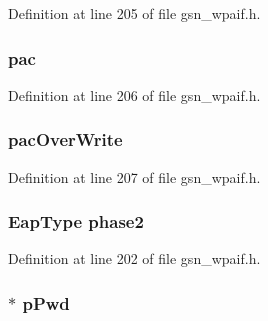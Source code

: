 Definition at line 205 of file gsn\_\-wpaif.h.

\hypertarget{a00423_a33c4dc19eab43caa7d0e1c94cb079af8}{
\subsubsection[{pac}]{ {\bf pac}}}
\label{a00423_a33c4dc19eab43caa7d0e1c94cb079af8}


Definition at line 206 of file gsn\_\-wpaif.h.

\hypertarget{a00423_ad688cc5df70aa8543118438c08e7c978}{
\subsubsection[{pacOverWrite}]{ {\bf pacOverWrite}}}
\label{a00423_ad688cc5df70aa8543118438c08e7c978}


Definition at line 207 of file gsn\_\-wpaif.h.

\hypertarget{a00423_adc4c063b01286b395255c244dda7138d}{
\subsubsection[{phase2}]{\setlength{\rightskip}{0pt plus 5cm}EapType {\bf phase2}}}
\label{a00423_adc4c063b01286b395255c244dda7138d}


Definition at line 202 of file gsn\_\-wpaif.h.

\hypertarget{a00423_a0c4c9d6363fa2c13ad01f4bf562b1248}{
\subsubsection[{pPwd}]{$\ast$ {\bf pPwd}}}
\label{a00423_a0c4c9d6363fa2c13ad01f4bf562b1248}


